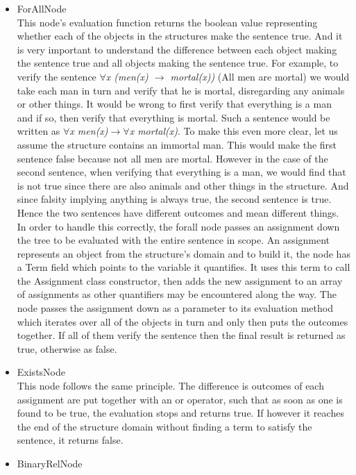 \documentclass{report}
\begin{document}
\begin{itemize}
\item ForAllNode\\
This node's evaluation function returns the boolean value representing whether each of the objects in the structures make the sentence true. And it is very important to understand the difference between each object making the sentence true and all objects making the sentence true. For example, to verify the sentence \emph{$\forall$x (men(x) $\rightarrow$ mortal(x))} (All men are mortal) we would take each man in turn and verify that he is mortal, disregarding any animals or other things. It would be wrong to first verify that everything is a man and if so, then verify that everything is mortal. Such a sentence would be written as \emph{$\forall$x men(x)$ \rightarrow \forall$x mortal(x)}. To make this even more clear, let us assume the structure contains an immortal man. This would make the first sentence false because not all men are mortal. However in the case of the second sentence, when verifying that everything is a man, we would find that is not true since there are also animals and other things in the structure. And since falsity implying anything is always true, the second sentence is true. Hence the two sentences have different outcomes and mean different things. \\
In order to handle this correctly, the forall node passes an assignment down the tree to be evaluated with the entire sentence in scope. An assignment represents an object from the structure's domain and to build it, the node has a Term field which points to the variable it quantifies. It uses this term to call the Assignment class constructor, then adds the new assignment to an array of assignments as other quantifiers may be encountered along the way. The node passes the assignment down as a parameter to its evaluation method which iterates over all of the objects in turn and only then puts the outcomes together. If all of them verify the sentence then the final result is returned as true, otherwise as false. 
\item ExistsNode\\
This node follows the same principle. The difference is outcomes of each assignment are put together with an or operator, such that as soon as one is found to be true, the evaluation stops and returns true. If however it reaches the end of the structure domain without finding a term to satisfy the sentence, it returns false.
\item BinaryRelNode\\

\end{itemize}
\end{document}
